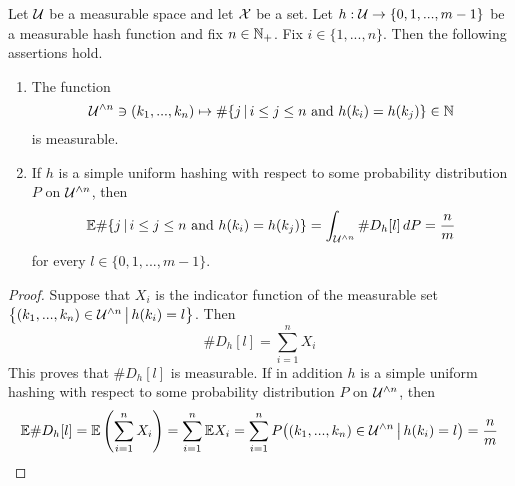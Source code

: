 \begin{theorem}\label{theorem:simple_uniform_hashing_expected_number_of_items_after_given_item}
Let ${\mathcal U}$ be a measurable space and let ${\mathcal X}$ be a set. Let $h:{\mathcal U}\rightarrow \{0,1,...,m-1\}$ be a measurable hash function and fix $n\in {\mathbb N}_+$. Fix $i\in \{1,...,n\}$. Then the following assertions hold.
\begin{enumerate}[label=\emph{\textbf{(\arabic*)}}, leftmargin=*]
\item The function 
$${\mathcal U}^{\wedge n} \ni (k_1,...,k_n) \mapsto \#\{j\,|\,i\leq j\leq n\mbox{ and }h(k_i) = h(k_j)\}\in {\mathbb N}$$
is measurable.
\item If $h$ is a simple uniform hashing with respect to some probability distribution $P$ on ${\mathcal U}^{\wedge n}$, then
$$\mathbb{E}\#\{j\,|\,i\leq j\leq n\mbox{ and }h(k_i) = h(k_j)\} = \int_{{\mathcal U}^{\wedge n}}\#D_h[l]\,dP = \frac{n}{m}$$
for every $l\in \{0,1,...,m-1\}$.
\end{enumerate}
\end{theorem}
\begin{proof}
Suppose that $X_i$ is the indicator function of the measurable set $\big\{(k_1,...,k_n)\in {\mathcal U}^{\wedge n}\,\big|\,h(k_i) = l\big\}$. Then
$$\# D_h[l] = \sum_{i=1}^nX_i$$
This proves that $\#D_h[l]$ is measurable. If in addition $h$ is a simple uniform hashing with respect to some probability distribution $P$ on ${\mathcal U}^{\wedge n}$, then
$$\mathbb{E}\# D_h[l] = \mathbb{E}\left(\sum_{i=1}^nX_i\right) = \sum_{i=1}^n\mathbb{E}X_i = \sum_{i=1}^nP\big((k_1,...,k_n)\in {\mathcal U}^{\wedge n}\,\big|\,h(k_i) = l\big) = \frac{n}{m}$$
\end{proof}





